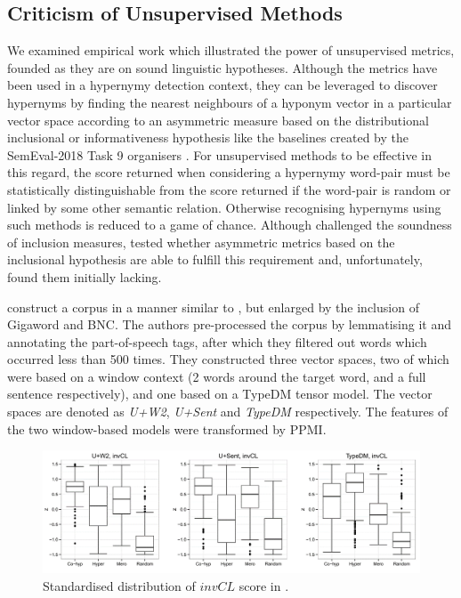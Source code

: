 \subsection{Criticism of Unsupervised Methods}
We examined empirical work which illustrated the power of unsupervised metrics, founded as they are on sound linguistic hypotheses.  Although the metrics have been used in a hypernymy detection context, they can be leveraged to discover hypernyms by finding the nearest neighbours of a hyponym vector in a particular vector space according to an asymmetric measure based on the distributional inclusional or informativeness hypothesis like the baselines created by the SemEval-2018 Task 9 organisers \citep{camacho2018semeval}.  For unsupervised methods to be effective in this regard, the score returned when considering a hypernymy word-pair must be statistically distinguishable from the score returned if the word-pair is random or linked by some other semantic relation.  Otherwise recognising hypernyms using such methods is reduced to a game of chance.  Although \citep{santus2014chasing} challenged the soundness of inclusion measures, \citep{roller2014inclusive} tested whether asymmetric metrics based on the inclusional hypothesis are able to fulfill this requirement and, unfortunately, found them initially lacking.

\citeauthor{roller2014inclusive} construct a corpus in a manner similar to \citep{santus2014chasing}, but enlarged by the inclusion of Gigaword and BNC.  The authors pre-processed the corpus by lemmatising it and annotating the part-of-speech tags, after which they filtered out words which occurred less than 500 times.  They constructed three vector spaces, two of which were based on a window context (2 words around the target word, and a full sentence respectively), and one based on a TypeDM tensor model.  The vector spaces are denoted as \textit{U+W2}, \textit{U+Sent} and \textit{TypeDM} respectively.  The features of the two window-based models were transformed by \ac{PPMI}.

\begin{figure}[ht!] 
  \centering
  \includegraphics[width=1.\linewidth]{images/standardised_distribution_invCL.png}
  \caption{Standardised distribution of $invCL$ score in \citep{roller2014inclusive}.}
  \label{fig:standardised_invCL_boxplot}
\end{figure}

